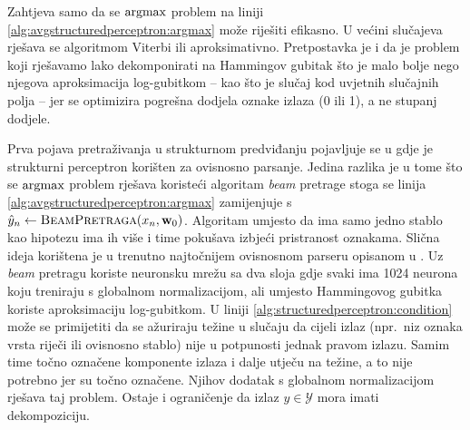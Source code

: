 Zahtjeva samo da se $\operatorname*{argmax}$ problem na liniji
\ref{alg:avgstructuredperceptron:argmax} može riješiti efikasno. U većini
slučajeva rješava se algoritmom Viterbi ili aproksimativno. Pretpostavka je i da
je problem koji rješavamo lako dekomponirati na Hammingov gubitak što je malo
bolje nego njegova aproksimacija log-gubitkom -- kao što je slučaj kod uvjetnih
slučajnih polja -- jer se optimizira pogrešna dodjela oznake izlaza (0 ili 1), a
ne stupanj dodjele.

Prva pojava pretraživanja u strukturnom predviđanju pojavljuje se u
\citep{collins2004incremental} gdje je strukturni perceptron korišten za
ovisnosno parsanje. Jedina razlika je u tome što se $\operatorname*{argmax}$ problem rješava
koristeći algoritam \textit{beam} pretrage stoga se linija
\ref{alg:avgstructuredperceptron:argmax} zamijenjuje s $\hat{y}_n \gets
\textsc{BeamPretraga}(x_n, \mathbf{w}_0)$. Algoritam umjesto da ima samo jedno
stablo kao hipotezu ima ih više i time pokušava izbjeći pristranost oznakama.
Slična ideja korištena je u trenutno najtočnijem ovisnosnom parseru opisanom u
\citep{andor2016globally}. Uz \textit{beam} pretragu koriste neuronsku mrežu sa
dva sloja gdje svaki ima 1024 neurona koju treniraju s globalnom normalizacijom,
ali umjesto Hammingovog gubitka koriste aproksimaciju log-gubitkom. U liniji
\ref{alg:structuredperceptron:condition} može se primijetiti da se ažuriraju
težine u slučaju da cijeli izlaz (npr.~niz oznaka vrsta riječi ili ovisnosno
stablo) nije u potpunosti jednak pravom izlazu. Samim time točno označene
komponente izlaza i dalje utječu na težine, a to nije potrebno jer su točno
označene. Njihov dodatak s globalnom normalizacijom rješava taj problem. Ostaje
i ograničenje da izlaz $y \in \mathcal{Y}$ mora imati dekompoziciju.

